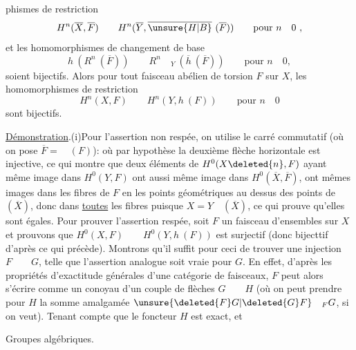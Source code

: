 
phismes de restriction
\[
H^n(\overline{X},\overline{F})\qquad H^n(\overline{Y},\overline{\unsure{H|B}}\ (\overline{F}))\qquad\text{pour }n\quad0\ ,
\]
et les homomorphismes de changement de base
\[
h\ (R^n\ (\overline{F}))\qquad R^n\quad{}_{Y}\ (\overline{h}\ (\overline{F}))\qquad\text{pour }n\quad0,
\]
soient bijectifs. Alors pour tout faisceau abélien de torsion $F$ sur $X$, les homomorphismes de restriction
\[
H^n(X,F)\qquad H^n(Y,h\ (F))\qquad\text{pour }n\quad0
\]
sont  bijectifs.

\uline{Démonstration}.\quad (i)\quad Pour l'assertion non respée, on utilise le carré commutatif (où on pose $\overline{F}=\quad(F)$):
où par hypothèse la deuxième flèche horizontale est injective, ce qui montre que deux éléments de $H^0(X\deleted{n},F)$ ayant même image dans $H^0(Y,F)$ ont aussi même image dans $H^0(\overline{X},\overline{F})$,  ont mêmes images dans les fibres  de $F$ en les points géométriques au dessus des points de $(\overline{X})$, donc dans \uline{toutes} les fibres puisque $X=Y\quad(\overline{X})$, ce qui prouve qu'elles sont égales. Pour prouver l'assertion respée, soit $F$ un faisceau d'ensembles sur $X$ et prouvons que $H^0(X,F)\qquad H^0(Y,h\ (F))$ est surjectif (donc bijecttif d'après ce qui précède). Montrons qu'il suffit pour ceci de trouver une injection $F\qquad G$, telle que l'assertion analogue soit vraie pour $G$. En effet, d'après les propriétés d'exactitude générales d'une catégorie de faisceaux, $F$ peut alors s'écrire comme un conoyau d'un couple de flèches $G\qquad H$ (où on peut prendre pour $H$ la somme amalgamée $\unsure{\deleted{F}G|\deleted{G}F}\quad{}_{F}G$, si on veut). Tenant compte que le foncteur $H$ est exact,  et

Groupes algébriques.

\quad
{}

